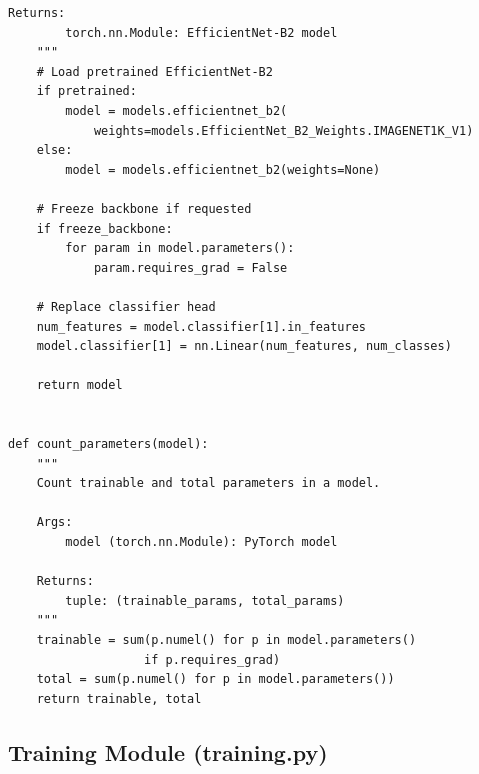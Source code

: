 \documentclass[man,12pt,letterpaper,donotrepeattitle,floatsintext]{apa7}
\begin{document}
\begin{lstlisting}[style=pythonstyle]
    Returns:
        torch.nn.Module: EfficientNet-B2 model
    """
    # Load pretrained EfficientNet-B2
    if pretrained:
        model = models.efficientnet_b2(
            weights=models.EfficientNet_B2_Weights.IMAGENET1K_V1)
    else:
        model = models.efficientnet_b2(weights=None)
    
    # Freeze backbone if requested
    if freeze_backbone:
        for param in model.parameters():
            param.requires_grad = False
    
    # Replace classifier head
    num_features = model.classifier[1].in_features
    model.classifier[1] = nn.Linear(num_features, num_classes)
    
    return model


def count_parameters(model):
    """
    Count trainable and total parameters in a model.
    
    Args:
        model (torch.nn.Module): PyTorch model
    
    Returns:
        tuple: (trainable_params, total_params)
    """
    trainable = sum(p.numel() for p in model.parameters() 
                   if p.requires_grad)
    total = sum(p.numel() for p in model.parameters())
    return trainable, total
\end{lstlisting}

\subsection{Training Module (training.py)}
\end{document}
